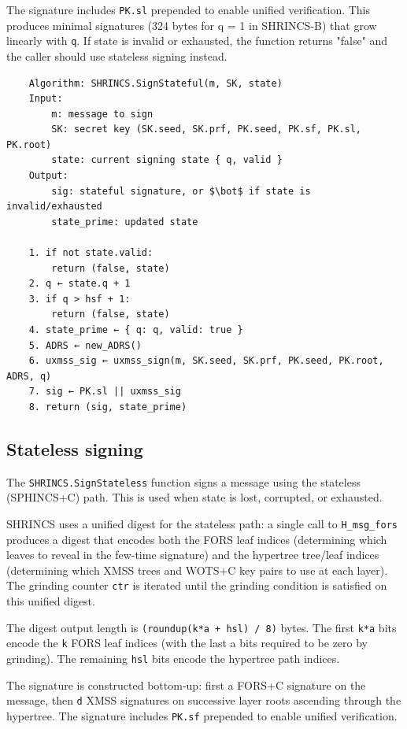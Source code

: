 The signature includes \texttt{PK.sl} prepended to enable unified verification. This produces minimal signatures (324 bytes for q = 1 in SHRINCS-B) that grow linearly with \texttt{q}. If state is invalid or exhausted, the function returns "false" and the caller should use stateless signing instead.
\begin{verbatim}
    Algorithm: SHRINCS.SignStateful(m, SK, state)
    Input:
        m: message to sign
        SK: secret key (SK.seed, SK.prf, PK.seed, PK.sf, PK.sl, PK.root)
        state: current signing state { q, valid }
    Output:
        sig: stateful signature, or $\bot$ if state is invalid/exhausted
        state_prime: updated state

    1. if not state.valid:
        return (false, state)
    2. q ← state.q + 1
    3. if q > hsf + 1:
        return (false, state)
    4. state_prime ← { q: q, valid: true }
    5. ADRS ← new_ADRS()
    6. uxmss_sig ← uxmss_sign(m, SK.seed, SK.prf, PK.seed, PK.root, ADRS, q)
    7. sig ← PK.sl || uxmss_sig
    8. return (sig, state_prime)
\end{verbatim}

\subsection{Stateless signing}
The \texttt{SHRINCS.SignStateless} function signs a message using the stateless (SPHINCS+C) path. This is used when state is lost, corrupted, or exhausted.

SHRINCS uses a unified digest for the stateless path: a single call to \texttt{H\_msg\_fors} produces a digest that encodes both the FORS leaf indices (determining which leaves to reveal in the few-time signature) and the hypertree tree/leaf indices (determining which XMSS trees and WOTS+C key pairs to use at each layer). The grinding counter \texttt{ctr} is iterated until the grinding condition is satisfied on this unified digest.

The digest output length is \texttt{(roundup(k*a + hsl) / 8)} bytes. The first \texttt{k*a} bits encode the \texttt{k} FORS leaf indices (with the last a bits required to be zero by grinding). The remaining \texttt{hsl} bits encode the hypertree path indices.

The signature is constructed bottom-up: first a FORS+C signature on the message, then \texttt{d} XMSS signatures on successive layer roots ascending through the hypertree. The signature includes \texttt{PK.sf} prepended to enable unified verification.

